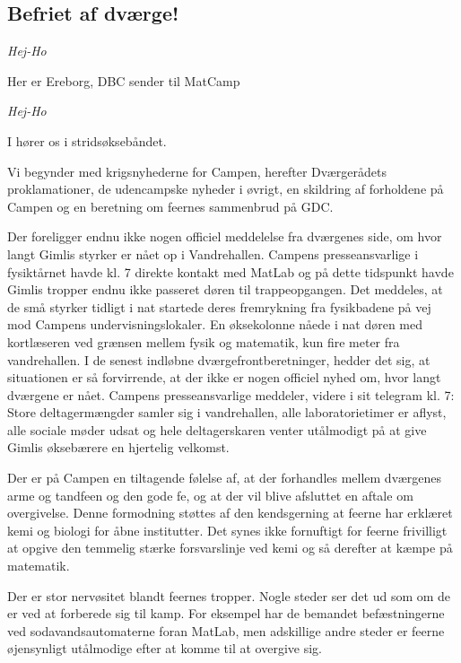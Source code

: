 \begin{minipage}[t]{170mm}
\vspace{3mm}
\begin{center}
\section*{Befriet af dværge!}
\end{center}

\emph{Hej-Ho}

Her er Ereborg, DBC sender til MatCamp 

\emph{Hej-Ho}

I hører os i stridsøksebåndet. 

Vi begynder med krigsnyhederne for Campen, herefter Dværgerådets proklamationer, de udencampske nyheder i øvrigt, en skildring af forholdene på Campen og en beretning om feernes sammenbrud på GDC.

Der foreligger endnu ikke nogen officiel meddelelse fra dværgenes side, om hvor langt Gimlis styrker er nået op i Vandrehallen. Campens presseansvarlige i fysiktårnet havde kl. 7 direkte kontakt med MatLab og på dette tidspunkt havde Gimlis tropper endnu ikke passeret døren til trappeopgangen. Det meddeles, at de små styrker tidligt i nat startede deres fremrykning fra fysikbadene på vej mod Campens undervisningslokaler. En øksekolonne nåede i nat døren med kortlæseren ved grænsen mellem fysik og matematik, kun fire meter fra vandrehallen. I de senest indløbne dværgefrontberetninger, hedder det sig, at situationen er så forvirrende, at der ikke er nogen officiel nyhed om, hvor langt dværgene er nået. Campens presseansvarlige meddeler, videre i sit telegram kl. 7: Store deltagermængder samler sig i vandrehallen, alle laboratorietimer er aflyst, alle sociale møder udsat og hele deltagerskaren venter utålmodigt på at give Gimlis øksebærere en hjertelig velkomst.

Der er på Campen en tiltagende følelse af, at der forhandles mellem dværgenes arme og tandfeen og den gode fe, og at der vil blive afsluttet en aftale om overgivelse. Denne formodning støttes af den kendsgerning at feerne har erklæret kemi og biologi for åbne institutter. Det synes ikke fornuftigt for feerne frivilligt at opgive den temmelig stærke forsvarslinje ved kemi og så derefter at kæmpe på matematik.

Der er stor nervøsitet blandt feernes tropper. Nogle steder ser det ud som om de er ved at forberede sig til kamp. For eksempel har de bemandet befæstningerne ved sodavandsautomaterne foran MatLab, men adskillige andre steder er feerne øjensynligt utålmodige efter at komme til at overgive sig. 


\end{minipage}

